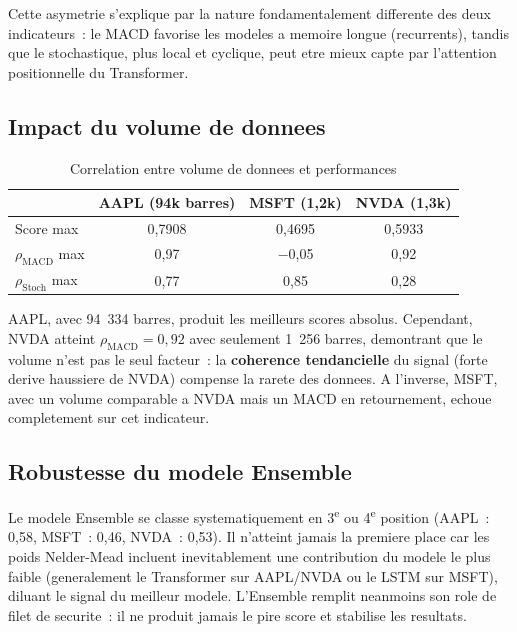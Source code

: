 \documentclass[12pt, a4paper]{article}
\begin{document}
Cette asymetrie s'explique par la nature fondamentalement differente des deux indicateurs~: le MACD favorise les modeles a memoire longue (recurrents), tandis que le stochastique, plus local et cyclique, peut etre mieux capte par l'attention positionnelle du Transformer.

\subsection{Impact du volume de donnees}

\begin{table}[H]
\centering
\caption{Correlation entre volume de donnees et performances}
\begin{tabular}{lccc}
\toprule
& \textbf{AAPL} (94k barres) & \textbf{MSFT} (1,2k) & \textbf{NVDA} (1,3k) \\
\midrule
Score max        & 0,7908 & 0,4695 & 0,5933 \\
$\rho_\text{MACD}$ max & 0,97 & $-$0,05 & 0,92 \\
$\rho_\text{Stoch}$ max & 0,77 & 0,85 & 0,28 \\
\bottomrule
\end{tabular}
\end{table}

AAPL, avec 94~334 barres, produit les meilleurs scores absolus. Cependant, NVDA atteint $\rho_\text{MACD} = 0{,}92$ avec seulement 1~256 barres, demontrant que le volume n'est pas le seul facteur~: la \textbf{coherence tendancielle} du signal (forte derive haussiere de NVDA) compense la rarete des donnees. A l'inverse, MSFT, avec un volume comparable a NVDA mais un MACD en retournement, echoue completement sur cet indicateur.

\subsection{Robustesse du modele Ensemble}

Le modele Ensemble se classe systematiquement en 3\textsuperscript{e} ou 4\textsuperscript{e} position (AAPL~: 0,58, MSFT~: 0,46, NVDA~: 0,53). Il n'atteint jamais la premiere place car les poids Nelder-Mead incluent inevitablement une contribution du modele le plus faible (generalement le Transformer sur AAPL/NVDA ou le LSTM sur MSFT), diluant le signal du meilleur modele. L'Ensemble remplit neanmoins son role de filet de securite~: il ne produit jamais le pire score et stabilise les resultats.

\end{document}
